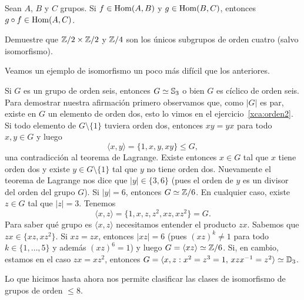 \begin{exercise}
Sean $A$, $B$ y $C$ grupos. Si $f\in\operatorname{Hom}(A,B)$ y $g\in\operatorname{Hom}(B,C)$, 
entonces $g\circ f\in\operatorname{Hom}(A,C)$. 	
\end{exercise}

\begin{exercise}
Demuestre que $\mathbb{Z}/2\times\mathbb{Z}/2$ y $\mathbb{Z}/4$ son los únicos subgrupos de orden cuatro (salvo isomorfismo).
\end{exercise}

Veamos un ejemplo de isomorfismo un poco más difícil que los anteriores.

\begin{example}
Si $G$ es un grupo de orden seis, entonces $G\simeq\mathbb{S}_3$ o bien $G$ es cíclico de orden seis. 
Para demostrar nuestra afirmación primero observamos que, como $|G|$ es par, existe en $G$ 
un elemento de orden dos, esto lo vimos en el ejercicio~\ref{xca:orden2}. Si todo elemento 
de $G\setminus\{1\}$ tuviera orden dos, entonces $xy=yx$ para todo $x,y\in G$ y luego
\[
\langle x,y\rangle=\{1,x,y,xy\}\leq G,
\]
una contradicción al teorema de Lagrange. Existe entonces $x\in G$ tal que $x$ tiene orden dos y existe $y\in G\setminus\{1\}$ tal que $y$ no tiene orden dos. Nuevamente el teorema
de Lagrange nos dice que $|y|\in\{3,6\}$ (pues el orden de $y$ es un divisor del orden del grupo $G$). Si $|y|=6$, entonces 
$G\simeq\mathbb{Z}/6$. En cualquier caso, existe $z\in G$ tal que 
$|z|=3$. Tenemos 
\[
\langle x,z\rangle=\{1,x,z,z^2,xz,xz^2\}=G.
\]
Para saber qué grupo es $\langle x,z\rangle$ necesitamos entender el producto $zx$. Sabemos que $zx\in\{xz,xz^2\}$. Si $xz=zx$, entonces $|xz|=6$ (pues $(xz)^k\ne1$ para todo $k\in\{1,\dots,5\}$ y 
además $(xz)^6=1$) y luego 
$G=\langle xz\rangle\simeq\mathbb{Z}/6$. Si, en cambio, estamos en el caso $zx=xz^2$, entonces
$G=\langle x,z:x^2=z^3=1,\,xzx^{-1}=z^2\rangle\simeq\mathbb{D}_3$.      
\end{example}


Lo que hicimos hasta ahora nos permite clasificar las clases de isomorfismo de grupos de orden $\leq8$.

